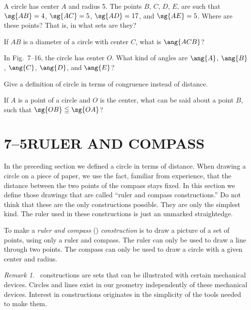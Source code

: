 \documentclass[11pt]{book}
\theoremstyle{bkplain}
\newenvironment{VIIremarkn}[1]%
  {\par\medskip\noindent\emph{Remark #1.}\ }{\par\medskip}
\theoremstyle{XIplainnote}
\theoremstyle{bkplain}
\theoremstyle{bkplain}
\begin{document}
\FIGVIIFIFTEEN

\begin{exercisecols}
\begin{exlist}
\item A circle has center $A$ and radius 5. The points $B$, $C$, $D$, $E$, are
  such that $\sg{AB} = 4$, $\sg{AC} = 5$, $\sg{AD} = 17$, and $\sg{AE} = 5$.
  Where are these points? That is, in what sets are they?
\item If $AB$ is a diameter of a circle with center $C$, what is $\ang{ACB}$?
\item In Fig.~7--16, the circle has center $O$. What kind of angles are
  $\ang{A}$, $\ang{B}$, $\ang{C}$, $\ang{D}$, and $\ang{E}$?
\exfig{\FIGVIISIXTEEN}
\item Give a definition of circle in terms of congruence instead of distance.
\item If $A$ is a point of a circle and $O$ is the center, what can be said
  about a point $B$, such that $\sg{OB} \leqq \sg{OA}$?
\end{exlist}
\end{exercisecols}

\section*{7--5\quad RULER AND COMPASS}

In the preceding section we defined a circle in terms of distance. When drawing
a circle on a piece of paper, we use the fact, familiar from experience, that
the distance between the two points of the compass stays fixed. In this section
we define those drawings that are called ``ruler and compass constructions.''
Do not think that these are the only constructions possible. They are only the
simplest kind. The ruler used in these constructions is just an unmarked
straightedge.

\FIGVIISEVENTEEN

\begin{definition}
To make a \emph{ruler and compass} (\RC) \emph{construction} is to draw a
picture of a set of points, using only a ruler and compass. The ruler can only
be used to draw a line through two points. The compass can only be used to
draw a circle with a given center and radius.
\end{definition}

\begin{VIIremarkn}{1}
\RC{} constructions are sets that can be illustrated with certain mechanical
devices. Circles and lines exist in our geometry independently of these
mechanical devices. Interest in \RC{} constructions originates in the
simplicity of the tools needed to make them.
\end{VIIremarkn}
\end{document}
